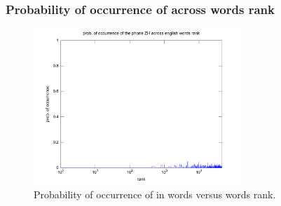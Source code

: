 \documentclass[notes]{beamer}
\begin{document}
\frame
{
  \frametitle{Probability of occurrence of \textipa{[Z]} across words rank}
\begin{figure}[h!]
\centering
\includegraphics[width=0.7\textwidth]{images/proboccwordsphone_ZH.pdf}
\caption{Probability of occurrence of \textipa{[Z]} in words versus words rank.}
\label{fig:proboccwordsphone_ZH}
\end{figure} 
}
\end{document}
